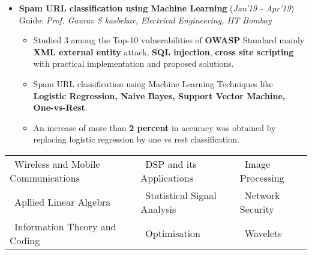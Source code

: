 \documentclass[10pt]{article}
\begin{document}
\begin{itemize}[leftmargin=0.4cm]
\begin{itemize}
	\end{itemize}\
	\vspace{-0.75cm}

\item \textbf{Spam URL classification using Machine Learning}
\hfill{(\textit{Jan'19 - Apr'19})}\\
Guide: \textit{Prof. Gaurav S kasbekar, Electrical Engineering, IIT Bombay}\\
\vspace{-0.7cm}
	\begin{itemize}
	\item Studied 3 among the Top-10 vulnerabilities of \textbf{OWASP} Standard mainly \textbf{XML external entity} attack, \textbf{SQL injection}, \textbf{cross site scripting} with practical implementation and proposed solutions.\vspace{-0.1cm}
	\item Spam URL classification using Machine Learning Techniques like \textbf{Logistic Regression, Naive Bayes, Support Vector Machine, One-vs-Rest}.
	\item An increase of more than \textbf{2 percent} in accuracy was obtained by replacing logistic regression by one vs rest classification.\vspace{-0.1cm}
    \end{itemize}

	\vspace{0.1cm}


\end{itemize}
\hspace{-0.17cm}\colorbox{bl}{}%
	\vspace{0.1cm} 


 	
		\begin{tabular}{ l l l }
		\hspace{0.55cm}\textbullet\ Wireless and Mobile Communications &  \textbullet\ DSP and its Applications & \textbullet\ Image Processing \\
		\hspace{0.55cm}\textbullet\ Apllied Linear Algebra & \textbullet\ Statistical Signal Analysis & \textbullet\ Network Security \\
		\hspace{0.55cm}\textbullet\ Information Theory and Coding & \textbullet\ Optimisation & \textbullet\ Wavelets\\
	\end{tabular}
	
\end{document}
